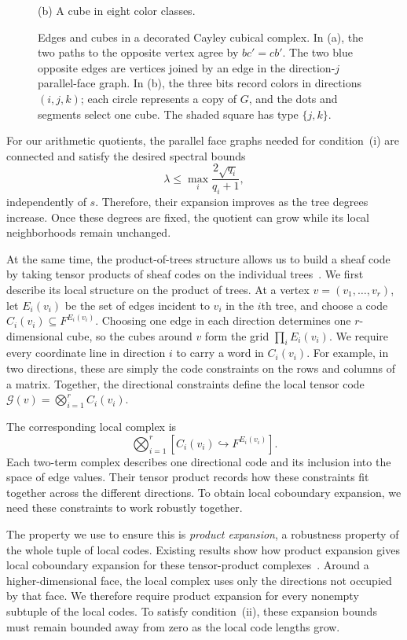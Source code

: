 \documentclass[11pt,letterpaper]{article}
\renewcommand{\le}{\leqslant}
\theoremstyle{definition}
\theoremstyle{remark}
\begin{document}
\begin{figure}[htbp]
\begin{minipage}[b]{0.49\textwidth}
\small (b) A cube in eight color classes.
\end{minipage}
\caption{Edges and cubes in a decorated Cayley cubical complex.
In (a), the two paths to the opposite vertex agree by $bc'=cb'$.
The two blue opposite edges are vertices joined by an edge in the
direction-$j$ parallel-face graph.
In (b), the three bits record colors in directions $(i,j,k)$;
each circle represents a copy of $G$, and the dots and segments
select one cube. The shaded square has type $\{j,k\}$.}
\label{fig:edges-and-cubes}
\end{figure}


For our arithmetic quotients, the parallel face graphs needed for condition~(i) are connected and satisfy the desired spectral bounds
\[
 \lambda\le\max_i\frac{2\sqrt{q_i}}{q_i+1},
\]
independently of $s$. Therefore, their expansion improves as the tree degrees increase. Once these degrees are fixed, the quotient can grow while its local neighborhoods remain unchanged. 

At the same time, the product-of-trees structure allows us
to build a sheaf code by taking tensor products of sheaf
codes on the individual trees~\cite{PanteleevKalachev2024}.
We first describe its local structure on the product of trees.
At a vertex $v=(v_1,\ldots,v_r)$, let $E_i(v_i)$ be the
set of edges incident to $v_i$ in the $i$th tree, and choose
a code $C_i(v_i)\subseteq F^{E_i(v_i)}$.
Choosing one edge in each direction determines one
$r$-dimensional cube, so the cubes around $v$ form the
grid $\prod_i E_i(v_i)$.
We require every coordinate line in direction $i$ to
carry a word in $C_i(v_i)$.
For example, in two directions, these are simply the
code constraints on the rows and columns of a matrix.
Together, the directional constraints define the
local tensor code
$\mathcal G(v)=\bigotimes_{i=1}^r C_i(v_i)$.

The corresponding local complex is
\[
 \bigotimes_{i=1}^r
 [C_i(v_i)\hookrightarrow F^{E_i(v_i)}].
\]
Each two-term complex describes one directional code
and its inclusion into the space of edge values.
Their tensor product records how these constraints
fit together across the different directions.
To obtain local coboundary expansion, we need these
constraints to work robustly together.

The property we use to ensure this is \emph{product expansion},
a robustness property of the whole tuple of local codes.
Existing results show how product expansion gives
local coboundary expansion for these tensor-product
complexes~\cite{KalachevPanteleev2025,DinurLinVidick2024}.
Around a higher-dimensional face, the local complex
uses only the directions not occupied by that face.
We therefore require product expansion for every
nonempty subtuple of the local codes.
To satisfy condition~(ii), these expansion bounds must
remain bounded away from zero as the local code lengths grow.
\end{document}
